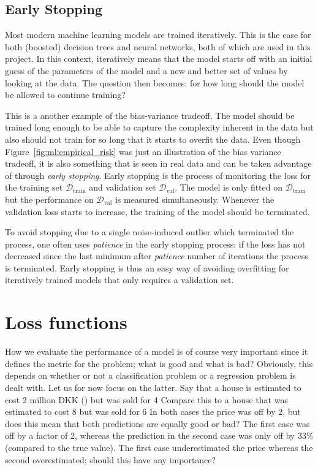 \subsection{Early Stopping}
\label{subsec:early_stopping}
Most modern machine learning models are trained iteratively. This is the case for both (boosted) decision trees and neural networks, both of which are used in this project. In this context, iteratively means that the model starts off with an initial guess of the parameters of the model and  a new and better set of values by looking at the data. The question then becomes: for how long should the model be allowed to continue training?

This is a another example of the bias-variance tradeoff. The model should be trained long enough to be able to capture the complexity inherent in the data but also should not train for so long that it starts to overfit the data. Even though Figure~\ref{fig:ml:empirical_risk} was just an illustration of the bias variance tradeoff, it is also something that is seen in real data and can be taken advantage of through \emph{early stopping}. Early stopping is the process of monitoring the loss for the training set $\mathcal{D}_\mathrm{train}$ and validation set $\mathcal{D}_\mathrm{val}$. The model is only fitted on $\mathcal{D}_\mathrm{train}$ but the performance on $\mathcal{D}_\mathrm{val}$ is measured simultaneously. Whenever the validation loss starts to increase, the training of the model should be terminated. 

To avoid stopping due to a single noise-induced outlier which terminated the process, one often uses \emph{patience} in the early stopping process: if the loss has not decreased since the last minimum after \emph{patience} number of iterations the process is terminated. Early stopping is thus an easy way of avoiding overfitting for iteratively trained models that only requires a validation set.  

\section{Loss functions}
\label{sec:ml:loss_function}
How we evaluate the performance of a model is of course very important since it defines the metric for the problem; what is good and what is bad? Obviously, this depends on whether or not a classification problem or a regression problem is dealt with. Let us for now focus on the latter. Say that a house is estimated to cost \num{2} million DKK (\si{\Mkr}) but was sold for \SI{4}{\Mkr} Compare this to a house that was estimated to cost \SI{8}{\Mkr} but was sold for \SI{6}{\Mkr} In both cases the price was off by \SI{2}{\Mkr}, but does this mean that both predictions are equally good or bad? The first case was off by a factor of \num{2}, whereas the prediction in the second case was only off by $33\%$ (compared to the true value). The first case underestimated the price whereas the second overestimated; should this have any importance?

